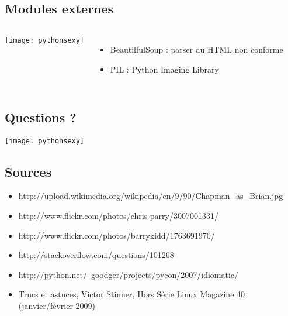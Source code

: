 \documentclass[handout]{beamer}
\begin{document}
\subsection{Modules externes}
\begin{frame}
    \begin{columns}[c]
        \texttt{[image: pythonsexy]}
        \begin{itemize}
        \item BeautilfulSoup : parser du HTML non conforme
        \item PIL : Python Imaging Library
        \end{itemize}
    \end{columns}
\end{frame}

\subsection{Questions ?}
\begin{frame}
    \begin{center}
        \texttt{[image: pythonsexy]}
    \end{center}
\end{frame}

\subsection{Sources}
\begin{frame}
    \begin{itemize}
    \item http://upload.wikimedia.org/wikipedia/en/9/90/Chapman\_as\_Brian.jpg
    \item http://www.flickr.com/photos/chris-parry/3007001331/
    \item http://www.flickr.com/photos/barrykidd/1763691970/
    \item http://stackoverflow.com/questions/101268
    \item http://python.net/~goodger/projects/pycon/2007/idiomatic/
    \item Trucs et astuces, Victor Stinner, Hors Série Linux Magazine 40 (janvier/février 2009)
    \end{itemize}
\end{frame}
\end{document}
